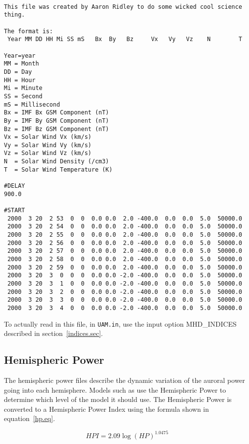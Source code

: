 \begin{verbatim}

This file was created by Aaron Ridley to do some wicked cool science thing.

The format is:
 Year MM DD HH Mi SS mS   Bx  By   Bz     Vx   Vy   Vz    N        T

Year=year
MM = Month
DD = Day
HH = Hour
Mi = Minute
SS = Second
mS = Millisecond
Bx = IMF Bx GSM Component (nT)
By = IMF By GSM Component (nT)
Bz = IMF Bz GSM Component (nT)
Vx = Solar Wind Vx (km/s)
Vy = Solar Wind Vy (km/s)
Vz = Solar Wind Vz (km/s)
N  = Solar Wind Density (/cm3)
T  = Solar Wind Temperature (K)

#DELAY
900.0

#START
 2000  3 20  2 53  0  0  0.0 0.0  2.0 -400.0  0.0  0.0  5.0  50000.0
 2000  3 20  2 54  0  0  0.0 0.0  2.0 -400.0  0.0  0.0  5.0  50000.0
 2000  3 20  2 55  0  0  0.0 0.0  2.0 -400.0  0.0  0.0  5.0  50000.0
 2000  3 20  2 56  0  0  0.0 0.0  2.0 -400.0  0.0  0.0  5.0  50000.0
 2000  3 20  2 57  0  0  0.0 0.0  2.0 -400.0  0.0  0.0  5.0  50000.0
 2000  3 20  2 58  0  0  0.0 0.0  2.0 -400.0  0.0  0.0  5.0  50000.0
 2000  3 20  2 59  0  0  0.0 0.0  2.0 -400.0  0.0  0.0  5.0  50000.0
 2000  3 20  3  0  0  0  0.0 0.0 -2.0 -400.0  0.0  0.0  5.0  50000.0
 2000  3 20  3  1  0  0  0.0 0.0 -2.0 -400.0  0.0  0.0  5.0  50000.0
 2000  3 20  3  2  0  0  0.0 0.0 -2.0 -400.0  0.0  0.0  5.0  50000.0
 2000  3 20  3  3  0  0  0.0 0.0 -2.0 -400.0  0.0  0.0  5.0  50000.0
 2000  3 20  3  4  0  0  0.0 0.0 -2.0 -400.0  0.0  0.0  5.0  50000.0
\end{verbatim}

To actually read in this file, in {\tt UAM.in}, use the input option MHD\_INDICES described in section~\ref{indices.sec}.

\subsection{Hemispheric Power}
\label{hp.sec}

The hemispheric power files describe the dynamic variation of the auroral power going into each hemisphere.  Models such as \cite{fuller87} use the Hemispheric Power to determine which level of the model it should use.  The Hemispheric Power is converted to a Hemispheric Power Index using the 
formula shown in equation~\ref{hp.eq}.

\begin{equation}
\label{hp.eq}
HPI = 2.09 \log(HP)^{1.0475}
\end{equation}

